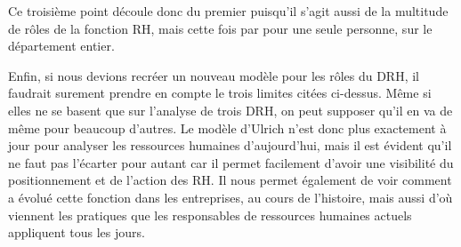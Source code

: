 Ce troisième point découle donc du premier puisqu'il s'agit aussi de la multitude de rôles de la fonction RH, mais cette fois par pour une seule personne, sur le département entier. \newline



Enfin, si nous devions recréer un nouveau modèle pour les rôles du DRH, il faudrait surement prendre en compte le trois limites citées ci-dessus. Même si elles ne se basent que sur l'analyse de trois DRH, on peut supposer qu'il en va de même pour beaucoup d'autres. Le modèle d'Ulrich n'est donc plus exactement à jour pour analyser les ressources humaines d'aujourd'hui, mais il est évident qu'il ne faut pas l'écarter pour autant car il permet facilement d'avoir une visibilité du positionnement et de l'action des RH. Il nous permet également de voir comment a évolué cette fonction dans les entreprises, au cours de l'histoire, mais aussi d'où viennent les pratiques que les responsables de ressources humaines actuels appliquent tous les jours. \\
